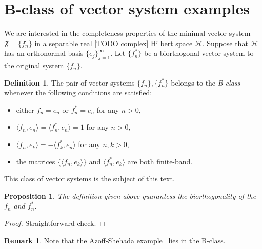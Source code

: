 \documentclass[12pt]{article}
\newcommand\inner[2]{\langle #1, #2 \rangle}
\renewcommand{\cal}[1]{\mathcal{#1}}
\newtheorem{prop}{Proposition}
\theoremstyle{definition}
\newtheorem{remark}{Remark}
\newtheorem{definition}{Definition}
\newcommand{\fsys}{\mathfrak{F}}
\numberwithin{remark}{section}
\numberwithin{theorem}{section}
\numberwithin{prop}{section}
\numberwithin{equation}{section}
\numberwithin{lemma}{section}
\numberwithin{prop_under_lemma}{lemma}
\begin{document}


\section{B-class of vector system examples}
    We are interested in the completeness properties of the minimal vector system $\fsys = \{f_n\}$ in a separable real [TODO complex] Hilbert space $\cal{H}$.
    Suppose that $\cal{H}$ has an orthonormal basis $\{e_j\}_{j=1}^\infty$.
    Let $\{f^*_n\}$ be a biorthogonal vector system to the original system $\{f_n\}$.
    \begin{definition}
        The pair of vector systems $\{f_n\}, \{f^*_n\}$ belongs to the \textit{B-class} whenever the following conditions are satisfied:
        \begin{itemize}
            \item either $f_n = e_n$ or $f^*_n = e_n$ for any $n > 0$,
            \item $\langle f_n, e_n\rangle = \langle f^*_n, e_n \rangle = 1$ for any $n > 0$,
            \item $\langle f_n, e_k \rangle = -\langle f^*_k, e_n \rangle$ for any $n, k > 0$,
            \item the matrices $\{\langle f_n, e_k\rangle\}$ and $\inner{f^*_n}{e_k}$ are both finite-band.
        \end{itemize}
    \end{definition}
    This class of vector systems is the subject of this text.
    \begin{prop}
        The definition given above guarantess the biorthogonality of the $f_n$ and $f^*_n$.
    \end{prop}
    \begin{proof}
        Straightforward check.
    \end{proof}
    \begin{remark}
        Note that the Azoff-Shehada example~\cite{azoff} lies in the B-class.
    \end{remark}
    
\end{document}
